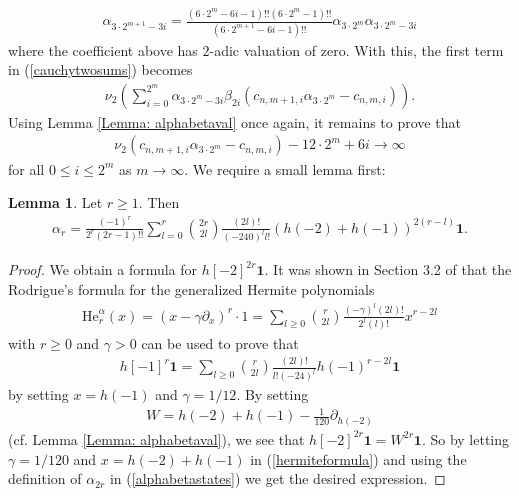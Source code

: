 \documentclass[10pt,a4paper]{amsart}
\numberwithin{equation}{section}
\theoremstyle{definition}
\newtheorem{Lemma}[Th]{Lemma}
\begin{document}
\begin{align*}
    \alpha_{3\cdot 2^{m+1}-3i} = \frac{(6\cdot 2^{m}-6i-1)!!(6\cdot 2^{m}-1)!!}{(6\cdot 2^{m+1}-6i-1)!!} \alpha_{3 \cdot 2^{m}} \alpha_{3 \cdot 2^{m}-3i}
\end{align*}
where the coefficient above has $2$-adic valuation of zero. With this, the first term in (\ref{cauchytwosums}) becomes
\begin{align*}
    \nu_{2}\left( \sum_{i=0}^{2^{m}} \alpha_{3 \cdot 2^{m}-3i}\beta_{2i} \left( c_{n,m+1,i} \alpha_{3 \cdot 2^{m}} - c_{n,m,i} \right) \right).
\end{align*}
Using Lemma \ref{Lemma: alphabetaval} once again, it remains to prove that 
\begin{align*}
    \nu_{2}\left( c_{n,m+1,i} \alpha_{3 \cdot 2^{m}} - c_{n,m,i} \right) - 12\cdot 2^{m}+6i \to \infty
\end{align*}
for all $0 \leq i \leq 2^{m}$ as $m \to \infty$. We require a small lemma first: \par 
\begin{Lemma} \label{Lemma: alphaformula}
    Let $r \geq 1$. Then
    \begin{align*}
        \alpha_{r} = \frac{(-1)^{r}}{2^{r}(2r-1)!!} \sum_{l=0}^{r} \binom{2r}{2l} \frac{(2l)!}{(-240)^{l}l!}\left( h(-2)+h(-1) \right)^{2(r-l)}\textbf{1}.
    \end{align*}
\end{Lemma}
\begin{proof}
    We obtain a formula for $h[-2]^{2r}\textbf{1}$. It was shown in Section 3.2 of \cite{BF24} that the Rodrigue's formula for the generalized Hermite polynomials
    \begin{align}
        \text{He}_{r}^{\alpha}(x) = (x- \gamma \partial_{x})^{r} \cdot 1 = \sum_{l \geq 0} \binom{r}{2l}\frac{(-\gamma)^{l}(2l)!}{2^{l}(l)!}x^{r-2l} \label{hermiteformula}
    \end{align}
    with $r \geq 0$ and $\gamma > 0$ can be used to prove that
    \begin{align*}
        h[-1]^{r}\textbf{1} = \sum_{l \geq 0} \binom{r}{2l} \frac{(2l)!}{l!(-24)^{l}} h(-1)^{r-2l}\textbf{1}
    \end{align*}
    by setting $x = h(-1)$ and $\gamma = 1/12$. By setting
    \begin{align*}
        W = h(-2)+h(-1)-\frac{1}{120}\partial_{h(-2)}
    \end{align*}
    (cf. Lemma \ref{Lemma: alphabetaval}), we see that $h[-2]^{2r}\textbf{1} = W^{2r}\textbf{1}$. So by letting $\gamma = 1/120$ and $x=h(-2)+h(-1)$ in (\ref{hermiteformula}) and using the definition of $\alpha_{2r}$ in (\ref{alphabetastates}) we get the desired expression.
\end{proof}
\end{document}
